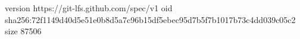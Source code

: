 version https://git-lfs.github.com/spec/v1
oid sha256:72f1149d40d5e51e0b8d5a7c96b15df5ebec95d7b5f7b1017b73c4dd039c05c2
size 87506
